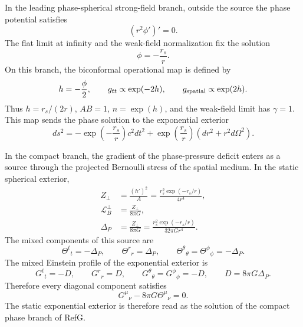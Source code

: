 \documentclass[12pt]{article}
\begin{document}
In the leading phase-spherical strong-field branch, outside the source the phase potential satisfies
\begin{equation}
\left(r^2\phi'\right)'=0 .
\end{equation}
The flat limit at infinity and the weak-field normalization fix the solution
\begin{equation}
\phi=-\frac{r_s}{r}.
\end{equation}
On this branch, the biconformal operational map is defined by
\begin{equation}
h=-\frac{\phi}{2},\qquad
g_{tt}\propto \exp(-2h),\qquad
g_{\rm spatial}\propto \exp(2h).
\end{equation}
Thus $h=r_s/(2r)$, $AB=1$, $n=\exp(h)$, and the weak-field limit has $\gamma=1$. This map sends the phase solution to the exponential exterior
\begin{equation}
ds^2=-\exp\!\left(-\frac{r_s}{r}\right)c^2dt^2
     +\exp\!\left(\frac{r_s}{r}\right)
      \left(dr^2+r^2d\Omega^2\right).
\end{equation}

In the compact branch, the gradient of the phase-pressure deficit enters as a source through the projected Bernoulli stress of the spatial medium. In the static spherical exterior,
\begin{align}
Z_\perp &= \frac{(h')^2}{A}
        = \frac{r_s^2\exp(-r_s/r)}{4r^4}, \\
\mathcal L_B^\perp &= \frac{Z_\perp}{8\pi G}, \\
\Delta_P &= \frac{Z_\perp}{8\pi G}
          = \frac{r_s^2\exp(-r_s/r)}{32\pi G r^4}.
\end{align}
The mixed components of this source are
\begin{equation}
\Theta^t{}_t=-\Delta_P,\qquad
\Theta^r{}_r=\Delta_P,\qquad
\Theta^\theta{}_\theta=\Theta^\phi{}_\phi=-\Delta_P .
\end{equation}
The mixed Einstein profile of the exponential exterior is
\begin{equation}
G^t{}_t=-D,\qquad
G^r{}_r=D,\qquad
G^\theta{}_\theta=G^\phi{}_\phi=-D,\qquad
D=8\pi G\Delta_P .
\end{equation}
Therefore every diagonal component satisfies
\begin{equation}
G^\mu{}_\nu-8\pi G\Theta^\mu{}_\nu=0 .
\end{equation}
The static exponential exterior is therefore read as the solution of the compact phase branch of RefG.
\end{document}
